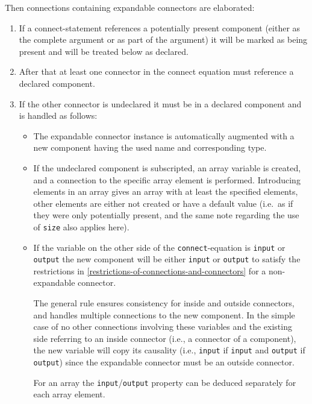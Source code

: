 Then connections containing expandable connectors are elaborated:
\begin{enumerate}
\item
  If a connect-statement references a potentially present component (either as the complete argument or as part of the argument) it will be marked as being present and will be treated below as declared.
\item
  After that at least one connector in the connect equation must reference a declared component.
\item
  If the other connector is undeclared it must be in a declared component and is handled as follows:
  \begin{itemize}
  \item
    The expandable connector instance is automatically augmented with a new component having the used name and corresponding type.
  \item
    If the undeclared component is subscripted, an array variable is created, and a connection to the specific array element is performed.
    Introducing elements in an array gives an array with at least the specified elements, other elements are either not created or have a default value (i.e.\ as if they were only potentially present, and the same note regarding the use of \lstinline!size! also applies here).
  \item
    If the variable on the other side of the \lstinline!connect!-equation is \lstinline!input! or \lstinline!output! the new component will be either \lstinline!input! or \lstinline!output! to satisfy the restrictions in \cref{restrictions-of-connections-and-connectors} for a non-expandable connector.
    \begin{nonnormative}
    The general rule ensures consistency for inside and outside connectors, and handles multiple connections to the new component.
    In the simple case of no other connections involving these variables and the existing side referring to an inside connector (i.e., a connector of a component), the new variable will copy its causality (i.e., \lstinline!input! if \lstinline!input! and \lstinline!output! if \lstinline!output!) since the expandable connector must be an outside connector.
    \end{nonnormative}
    For an array the \lstinline!input!/\lstinline!output! property can be deduced separately for each array element.
  \end{itemize}
\end{enumerate}

